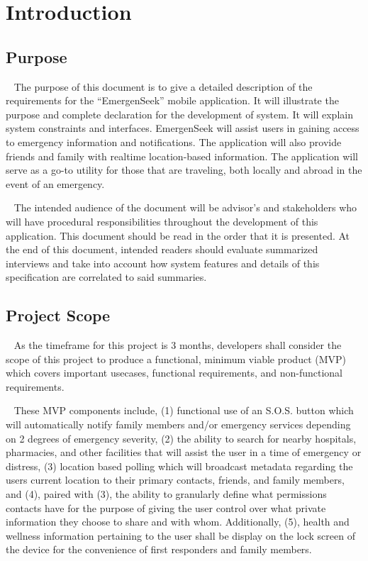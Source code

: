 \documentclass{scrreprt}
\begin{document}
\chapter{Introduction}


\section{Purpose}
\par ~ The purpose of this document is to give a detailed description of the requirements for the ``EmergenSeek'' mobile application. It will illustrate the purpose and complete declaration for the development of system. It will explain system constraints and interfaces. EmergenSeek will assist users in gaining access to emergency information and notifications. The application will also provide friends and family with realtime location-based information. The application will serve as a go-to utility for those that are traveling, both locally and abroad in the event of an emergency.
\par ~ The intended audience of the document will be advisor's and stakeholders who will have procedural responsibilities throughout the development of this application. This document should be read in the order that it is presented. At the end of this document, intended readers should evaluate summarized interviews and take into account how system features and details of this specification are correlated to said summaries.


\section{Project Scope}
\par ~ As the timeframe for this project is 3 months, developers shall consider the scope of this project to produce a functional, minimum viable product (MVP) which covers important usecases, functional requirements, and non-functional requirements. 

\par ~ These MVP components include, (1) functional use of an S.O.S. button which will automatically notify family members and/or emergency services depending on 2 degrees of emergency severity, (2) the ability to search for nearby hospitals, pharmacies, and other facilities that will assist the user in a time of emergency or distress, (3) location based polling which will broadcast metadata regarding the users current location to their primary contacts, friends, and family members, and (4), paired with (3), the ability to granularly define what permissions contacts have for the purpose of giving the user control over what private information they choose to share and with whom. Additionally, (5), health and wellness information pertaining to the user shall be display on the lock screen of the device for the convenience of first responders and family members.
\end{document}
